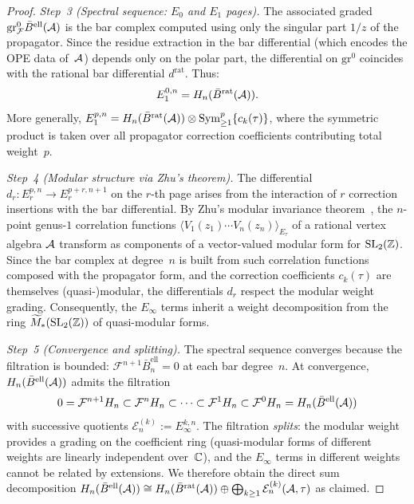 \begin{proof}
\emph{Step~3 (Spectral sequence: $E_0$ and $E_1$ pages).}
The associated graded $\mathrm{gr}^0_{\mathcal{F}}
\bar{B}^{\mathrm{ell}}(\mathcal{A})$ is the bar complex computed using only the
singular part $1/z$ of the propagator.  Since the residue extraction
in the bar differential (which encodes the OPE data of~$\mathcal{A}$) depends
only on the polar part, the differential on $\mathrm{gr}^0$ coincides
with the rational bar differential $d^{\mathrm{rat}}$.  Thus:
\[
E_1^{0,n} = H_n(\bar{B}^{\mathrm{rat}}(\mathcal{A})).
\]
More generally, $E_1^{p,n} = H_n(\bar{B}^{\mathrm{rat}}(\mathcal{A})) \otimes
\mathrm{Sym}^p_{\geq 1}\{c_k(\tau)\}$, where the symmetric product is
taken over all propagator correction coefficients contributing total
weight~$p$.

\emph{Step~4 (Modular structure via Zhu's theorem).}
The differential $d_r \colon E_r^{p,n} \to E_r^{p+r,n+1}$ on the
$r$-th page arises from the interaction of $r$ correction insertions
with the bar differential.  By Zhu's modular invariance
theorem~\cite{Zhu96}, the $n$-point genus-$1$ correlation functions
$\langle V_1(z_1) \cdots V_n(z_n) \rangle_{E_\tau}$ of a rational
vertex algebra $\mathcal{A}$ transform as components of a vector-valued modular
form for $\mathrm{SL}_2(\mathbb{Z})$.  Since the bar complex at degree~$n$ is
built from such correlation functions composed with the propagator form,
and the correction coefficients $c_k(\tau)$ are themselves
(quasi-)modular, the differentials $d_r$ respect the modular weight
grading.  Consequently, the $E_\infty$ terms inherit a weight
decomposition from the ring $\widetilde{M}_*(\mathrm{SL}_2(\mathbb{Z}))$
of quasi-modular forms.

\emph{Step~5 (Convergence and splitting).}
The spectral sequence converges because the filtration is bounded:
$\mathcal{F}^{n+1}\bar{B}^{\mathrm{ell}}_n = 0$ at each bar
degree~$n$.  At convergence, $H_n(\bar{B}^{\mathrm{ell}}(\mathcal{A}))$
admits the filtration
\[
0 = \mathcal{F}^{n+1} H_n \subset \mathcal{F}^n H_n \subset \cdots
\subset \mathcal{F}^1 H_n \subset \mathcal{F}^0 H_n
= H_n(\bar{B}^{\mathrm{ell}}(\mathcal{A}))
\]
with successive quotients $\mathcal{E}^{(k)}_n := E_\infty^{k,n}$.
The filtration \emph{splits}: the modular weight provides a grading
on the coefficient ring (quasi-modular forms of different weights are
linearly independent over~$\mathbb{C}$), and the $E_\infty$ terms in
different weights cannot be related by extensions.  We therefore
obtain the direct sum decomposition
$H_n(\bar{B}^{\mathrm{ell}}(\mathcal{A})) \cong H_n(\bar{B}^{\mathrm{rat}}(\mathcal{A}))
\oplus \bigoplus_{k \geq 1} \mathcal{E}^{(k)}_n(\mathcal{A}, \tau)$
as claimed.


\end{proof}
